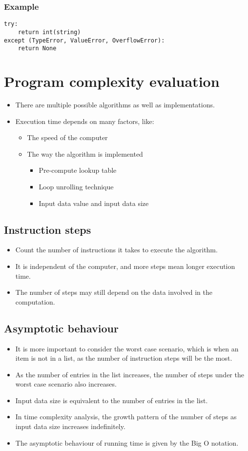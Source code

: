 \documentclass[11pt]{article}
\begin{document}
\subsubsection{Example}
\label{sec:org968081c}
\begin{verbatim}
try:
    return int(string)
except (TypeError, ValueError, OverflowError):
    return None
\end{verbatim}

 \newpage
\section{Program complexity evaluation}
\label{sec:org8c60e05}
\begin{itemize}
\item There are multiple possible algorithms as well as implementations.
\item Execution time depends on many factors, like:
\begin{itemize}
\item The speed of the computer
\item The way the algorithm is implemented
\begin{itemize}
\item Pre-compute lookup table
\item Loop unrolling technique
\item Input data value and input data size
\end{itemize}
\end{itemize}
\end{itemize}
\subsection{Instruction steps}
\label{sec:org0e855d2}
\begin{itemize}
\item Count the number of instructions it takes to execute the algorithm.
\item It is independent of the computer, and more steps mean longer execution time.
\item The number of steps may still depend on the data involved in the computation.
\end{itemize}
\subsection{Asymptotic behaviour}
\label{sec:org773e01a}
\begin{itemize}
\item It is more important to consider the worst case scenario, which is when an item is not in a list, as the number of instruction steps will be the most.
\item As the number of entries in the list increases, the number of steps under the worst case scenario also increases.
\item Input data size is equivalent to the number of entries in the list.
\item In time complexity analysis, the growth pattern of the number of steps as input data size increases indefinitely.
\item The asymptotic behaviour of running time is given by the Big O notation.
\end{itemize}
\end{document}
